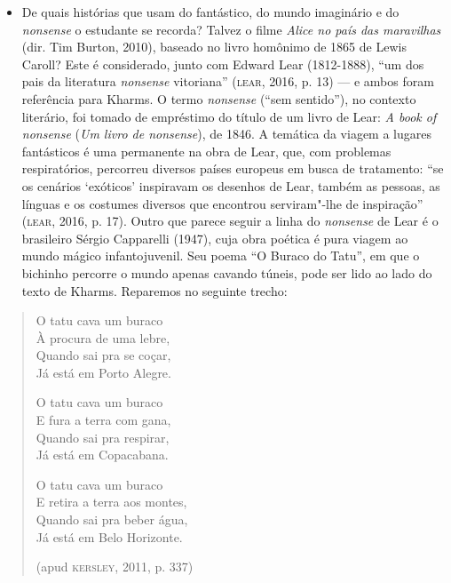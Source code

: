 \documentclass[11pt]{extarticle}
\begin{document}
\begin{itemize}
\item De quais histórias que usam do fantástico, do mundo imaginário e do
\emph{nonsense} o estudante se recorda? Talvez o filme \emph{Alice no
país das maravilhas} (dir. Tim Burton, 2010), baseado no livro homônimo
de 1865 de Lewis Caroll? Este é considerado, junto com Edward Lear
(1812-1888), ``um dos pais da literatura \emph{nonsense} vitoriana''
(\textsc{lear}, 2016, p. 13) --- e ambos foram referência para Kharms. O termo
\emph{nonsense} (``sem sentido''), no contexto literário, foi tomado de
empréstimo do título de um livro de Lear: \emph{A book of nonsense}
(\emph{Um livro de nonsense}), de 1846. A temática da viagem a lugares
fantásticos é uma permanente na obra de Lear, que, com problemas
respiratórios, percorreu diversos países europeus em busca de
tratamento: ``se os cenários `exóticos' inspiravam os desenhos de Lear,
também as pessoas, as línguas e os costumes diversos que encontrou
serviram"-lhe de inspiração'' (\textsc{lear}, 2016, p. 17). Outro que parece
seguir a linha do \emph{nonsense} de Lear é o brasileiro Sérgio
Capparelli (1947), cuja obra poética é pura viagem ao mundo mágico
infantojuvenil. Seu poema ``O Buraco do Tatu'', em que o bichinho
percorre o mundo apenas cavando túneis, pode ser lido ao lado do texto
de Kharms. Reparemos no seguinte trecho:
\end{itemize}

\begin{verse}
O tatu cava um buraco\\
À procura de uma lebre,\\
Quando sai pra se coçar,\\
Já está em Porto Alegre.

O tatu cava um buraco\\
E fura a terra com gana,\\
Quando sai pra respirar,\\
Já está em Copacabana.

O tatu cava um buraco\\
E retira a terra aos montes,\\
Quando sai pra beber água,\\
Já está em Belo Horizonte.

(apud \textsc{kersley}, 2011, p. 337)
\end{verse}



\end{document}
